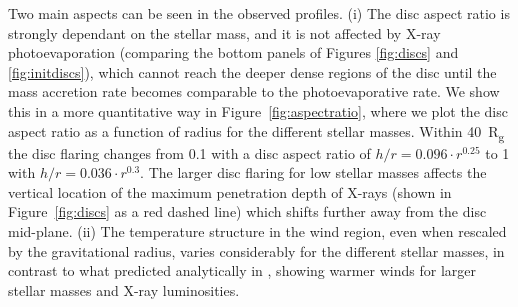 \documentclass[usenatbib,useAMS,usedcolumn]{mnras}
\begin{document}
Two main aspects can be seen in the observed profiles. 
(i) The disc aspect ratio is strongly dependant on the stellar mass, and it is not affected by X-ray photoevaporation (comparing the bottom panels of Figures \ref{fig:discs} and \ref{fig:initdiscs}), which cannot reach the deeper dense regions of the disc until the mass accretion rate becomes comparable to the photoevaporative rate. We show this in a more quantitative way in Figure~\ref{fig:aspectratio}, where we plot the disc aspect ratio as a function of radius for the different stellar masses. Within \SI{40}{R_g} the disc flaring changes from \SI{0.1}{\solarmass} with a disc aspect ratio of $h/r = 0.096 \cdot r^{0.25}$ to \SI{1}{\solarmass} with $h/r = 0.036 \cdot r^{0.3}$. The larger disc flaring for low stellar masses affects the vertical location of the maximum penetration depth of X-rays (shown in Figure~\ref{fig:discs} as a red dashed line) which shifts further away from the disc mid-plane.
(ii) The temperature structure in the wind region, even when rescaled by the gravitational radius, varies considerably for the different stellar masses, in contrast to what predicted analytically in , showing warmer winds for larger stellar masses and X-ray luminosities.
\end{document}
